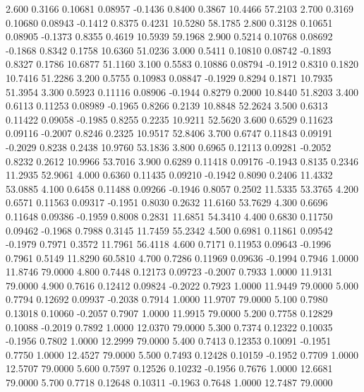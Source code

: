    2.600   0.3166   0.10681   0.08957  -0.1436   0.8400   0.3867  10.4466  57.2103
   2.700   0.3169   0.10680   0.08943  -0.1412   0.8375   0.4231  10.5280  58.1785
   2.800   0.3128   0.10651   0.08905  -0.1373   0.8355   0.4619  10.5939  59.1968
   2.900   0.5214   0.10768   0.08692  -0.1868   0.8342   0.1758  10.6360  51.0236
   3.000   0.5411   0.10810   0.08742  -0.1893   0.8327   0.1786  10.6877  51.1160
   3.100   0.5583   0.10886   0.08794  -0.1912   0.8310   0.1820  10.7416  51.2286
   3.200   0.5755   0.10983   0.08847  -0.1929   0.8294   0.1871  10.7935  51.3954
   3.300   0.5923   0.11116   0.08906  -0.1944   0.8279   0.2000  10.8440  51.8203
   3.400   0.6113   0.11253   0.08989  -0.1965   0.8266   0.2139  10.8848  52.2624
   3.500   0.6313   0.11422   0.09058  -0.1985   0.8255   0.2235  10.9211  52.5620
   3.600   0.6529   0.11623   0.09116  -0.2007   0.8246   0.2325  10.9517  52.8406
   3.700   0.6747   0.11843   0.09191  -0.2029   0.8238   0.2438  10.9760  53.1836
   3.800   0.6965   0.12113   0.09281  -0.2052   0.8232   0.2612  10.9966  53.7016
   3.900   0.6289   0.11418   0.09176  -0.1943   0.8135   0.2346  11.2935  52.9061
   4.000   0.6360   0.11435   0.09210  -0.1942   0.8090   0.2406  11.4332  53.0885
   4.100   0.6458   0.11488   0.09266  -0.1946   0.8057   0.2502  11.5335  53.3765
   4.200   0.6571   0.11563   0.09317  -0.1951   0.8030   0.2632  11.6160  53.7629
   4.300   0.6696   0.11648   0.09386  -0.1959   0.8008   0.2831  11.6851  54.3410
   4.400   0.6830   0.11750   0.09462  -0.1968   0.7988   0.3145  11.7459  55.2342
   4.500   0.6981   0.11861   0.09542  -0.1979   0.7971   0.3572  11.7961  56.4118
   4.600   0.7171   0.11953   0.09643  -0.1996   0.7961   0.5149  11.8290  60.5810
   4.700   0.7286   0.11969   0.09636  -0.1994   0.7946   1.0000  11.8746  79.0000
   4.800   0.7448   0.12173   0.09723  -0.2007   0.7933   1.0000  11.9131  79.0000
   4.900   0.7616   0.12412   0.09824  -0.2022   0.7923   1.0000  11.9449  79.0000
   5.000   0.7794   0.12692   0.09937  -0.2038   0.7914   1.0000  11.9707  79.0000
   5.100   0.7980   0.13018   0.10060  -0.2057   0.7907   1.0000  11.9915  79.0000
   5.200   0.7758   0.12829   0.10088  -0.2019   0.7892   1.0000  12.0370  79.0000
   5.300   0.7374   0.12322   0.10035  -0.1956   0.7802   1.0000  12.2999  79.0000
   5.400   0.7413   0.12353   0.10091  -0.1951   0.7750   1.0000  12.4527  79.0000
   5.500   0.7493   0.12428   0.10159  -0.1952   0.7709   1.0000  12.5707  79.0000
   5.600   0.7597   0.12526   0.10232  -0.1956   0.7676   1.0000  12.6681  79.0000
   5.700   0.7718   0.12648   0.10311  -0.1963   0.7648   1.0000  12.7487  79.0000
